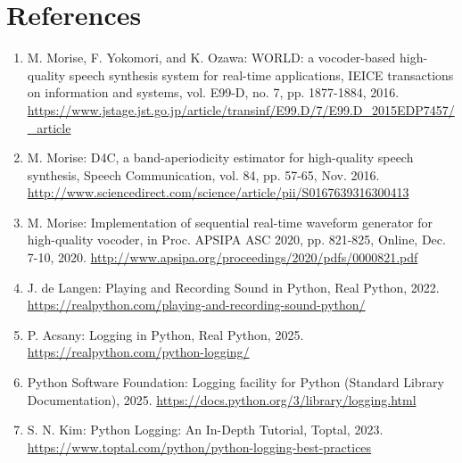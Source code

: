 \documentclass[11pt]{article}
\begin{document}
\pagebreak

\section*{References}
\begin{enumerate}
    \item M. Morise, F. Yokomori, and K. Ozawa: WORLD: a vocoder-based high-quality speech synthesis system for real-time applications, IEICE transactions on information and systems, vol. E99-D, no. 7, pp. 1877-1884, 2016. \url{https://www.jstage.jst.go.jp/article/transinf/E99.D/7/E99.D_2015EDP7457/_article}
    \item M. Morise: D4C, a band-aperiodicity estimator for high-quality speech synthesis, Speech Communication, vol. 84, pp. 57-65, Nov. 2016. \url{http://www.sciencedirect.com/science/article/pii/S0167639316300413}
    \item M. Morise: Implementation of sequential real-time waveform generator for high-quality vocoder, in Proc. APSIPA ASC 2020, pp. 821-825, Online, Dec. 7-10, 2020. \url{http://www.apsipa.org/proceedings/2020/pdfs/0000821.pdf}
    \item J. de Langen: Playing and Recording Sound in Python, Real Python, 2022. \url{https://realpython.com/playing-and-recording-sound-python/}
    \item P. Acsany: Logging in Python, Real Python, 2025. \url{https://realpython.com/python-logging/}
    \item Python Software Foundation: Logging facility for Python (Standard Library Documentation), 2025. \url{https://docs.python.org/3/library/logging.html}
    \item S. N. Kim: Python Logging: An In-Depth Tutorial, Toptal, 2023. \url{https://www.toptal.com/python/python-logging-best-practices}
\end{enumerate}
\end{document}
